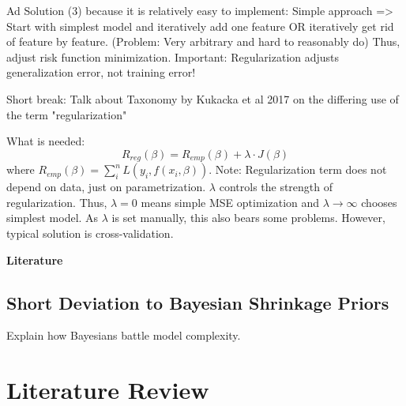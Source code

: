 \documentclass[12pt,a4paper]{article}
\newenvironment{lightbluebox}{%
    \begin{tcolorbox}[colback=lightblue, colframe=lightblue, fontupper=\itshape]%
}{%
    \end{tcolorbox}%
}
\begin{document}
\begin{lightbluebox}
Ad Solution (3) because it is relatively easy to implement: Simple approach => Start with simplest model and iteratively add one feature OR iteratively get rid of feature by feature. (Problem: Very arbitrary and hard to reasonably do) Thus, adjust risk function minimization. Important: Regularization adjusts generalization error, not training error!

Short break: Talk about Taxonomy by Kukacka et al 2017 on the differing use of the term "regularization" 

What is needed: 
\[
R_{reg}(\beta) = R_{emp}(\beta)+ \lambda \cdot J(\beta)
\]
where $R_{emp}(\beta) = \sum_i^n L(y_i, f(x_i, \beta))$. Note: Regularization term does not depend on data, just on parametrization. $\lambda$ controls the strength of regularization. Thus, $\lambda = 0$ means simple MSE optimization and $\lambda \to \infty$ chooses simplest model. As $\lambda$ is set manually, this also bears some problems. However, typical solution is cross-validation. 

\textbf{Literature}
\parencite{Taxonomy2017}
\end{lightbluebox}

\subsection{Short Deviation to Bayesian Shrinkage Priors}
Explain how Bayesians battle model complexity. 

\newpage

\section{Literature Review}
\end{document}
